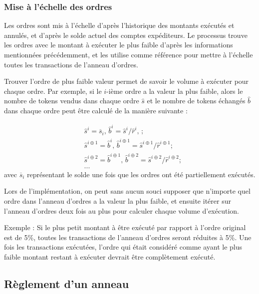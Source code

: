 \documentclass[UTF8,nofonts]{article}
\begin{document}
\begin{multicols}{2}
\subsubsection{Mise à l'échelle des ordres \label{sec:order_scaling}}
Les ordres sont mis à l'échelle d'après l'historique des montants exécutés et annulés, et d'après le solde actuel des comptes expéditeurs. Le processus trouve les ordres avec le montant à exécuter le plus faible d'après les informations mentionnées précédemment, et les utilise comme référence pour mettre à l'échelle toutes les transactions de l'anneau d'ordres. 

Trouver l'ordre de plus faible valeur permet de savoir le volume à exécuter pour chaque ordre. Par exemple, si le $i$-ième ordre a la valeur la plus faible, alors le nombre de tokens vendus dans chaque ordre $\hat{s}$ et le nombre de tokens échangés $\hat{b}$ dans chaque ordre peut être calculé de la manière suivante :

\[
\begin{split}
&\hat{s}^{i}=\overline{s}_i\text{, } \hat{b}^{i}=\hat{s}^{i}/ \hat{r}^i\text{, }\text{;}\\
&\hat{s}^{i\oplus 1}=\hat{b}^i\text{, } \hat{b}^{i\oplus 1}=\hat{s}^{i\oplus 1}/ \hat{r}^{i\oplus 1}\text{;}\\
&\hat{s}^{i\oplus 2}=\hat{b}^{i\oplus 1}\text{, } \hat{b}^{i\oplus 2}=\hat{s}^{i\oplus 2}/ \hat{r}^{i\oplus 2}\text{;}\\
& ...
\end{split}
\]
avec $\overline{s}_i$ représentant le solde une fois que les ordres ont été partiellement exécutés. 

Lors de l'implémentation, on peut sans aucun souci supposer que n'importe quel ordre dans l'anneau d'ordres a la valeur la plus faible, et ensuite itérer sur l'anneau d'ordres deux fois au plus pour calculer chaque volume d'exécution.

Exemple : Si le plus petit montant à être exécuté par rapport à l'ordre original est de 5\%, toutes les transactions de l'anneau d'ordres seront réduites à 5\%. Une fois les transactions exécutées, l'ordre qui était considéré comme ayant le plus faible montant restant à exécuter devrait être complètement exécuté.

\subsection{Règlement d'un anneau\label{sec:settlement}}


\end{multicols}
\end{document}
